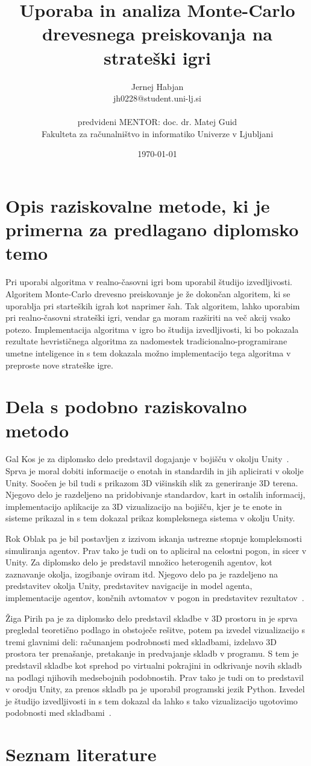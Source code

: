 \documentclass[11pt,a4paper]{article}
\title{Uporaba in analiza Monte-Carlo drevesnega preiskovanja na strateški igri}
\author{Jernej Habjan\\
jh0228@student.uni-lj.si\\
\ \\
predvideni MENTOR: doc. dr. Matej Guid \\
Fakulteta za računalništvo in informatiko Univerze v Ljubljani
\date{\today}         
}
\begin{document}
\maketitle

\section{Opis raziskovalne metode, ki je primerna za predlagano diplomsko temo}


Pri uporabi algoritma v realno-časovni igri bom uporabil študijo izvedljivosti.
Algoritem Monte-Carlo drevesno preiskovanje je že dokončan algoritem, ki se uporablja pri starteških igrah kot naprimer šah.
Tak algoritem, lahko uporabim pri realno-časovni strateški igri, vendar ga moram razširiti na več akcij vsako potezo.
Implementacija algoritma v igro bo študija izvedljivosti, ki bo pokazala rezultate hevrističnega algoritma za nadomestek tradicionalno-programirane umetne inteligence in s tem dokazala možno implementacijo tega algoritma v preproste nove strateške igre.

\section{Dela s podobno raziskovalno metodo}


Gal Kos je za diplomsko delo predstavil dogajanje v bojišču v okolju Unity~\cite{bojisce}. Sprva je moral dobiti informacije o enotah in standardih in jih aplicirati v okolje Unity. Soočen je bil tudi s prikazom 3D višinskih slik za generiranje 3D terena.
Njegovo delo je razdeljeno na pridobivanje standardov, kart in ostalih informacij, implementacijo aplikacije za 3D vizualizacijo na bojišču, kjer je te enote in sisteme prikazal in s tem dokazal prikaz kompleksnega sistema v okolju Unity.

Rok Oblak pa je bil postavljen z izzivom iskanja ustrezne stopnje kompleksnosti simuliranja agentov. Prav tako je tudi on to apliciral na celostni pogon, in sicer v Unity.
Za diplomsko delo je predstavil množico heterogenih agentov, kot zaznavanje okolja, izogibanje oviram itd.
Njegovo delo pa je razdeljeno na predstavitev okolja Unity, predstavitev navigacije in model agenta, implementacije agentov, končnih avtomatov v pogon in predstavitev rezultatov~\cite{heterogeni}.


Žiga Pirih pa je za diplomsko delo predstavil skladbe v 3D prostoru in je sprva pregledal teoretično podlago in obstoječe rešitve, potem pa izvedel vizualizacijo s tremi glavnimi deli: računanjem podrobnosti med skladbami, izdelavo 3D prostora ter prenašanje, pretakanje in predvajanje skladb v programu. S tem je predstavil skladbe kot sprehod po virtualni pokrajini in odkrivanje novih skladb na podlagi njihovih medsebojnih podobnostih. Prav tako je tudi on to predstavil v orodju Unity, za prenos skladb pa je uporabil programski jezik Python. Izvedel je študijo izvedljivosti in s tem dokazal da lahko s tako vizualizacijo ugotovimo podobnosti med skladbami~\cite{viz}.
\section{Seznam literature}



\end{document}
